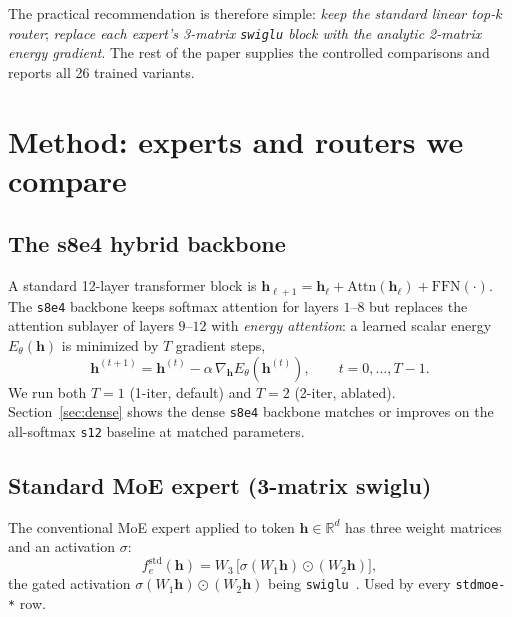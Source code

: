 \documentclass[oneside]{article}
\begin{document}
The practical recommendation is therefore simple: \emph{keep the
standard linear top-$k$ router}; \emph{replace each expert's 3-matrix
\texttt{swiglu} block with the analytic 2-matrix energy gradient}.
The rest of the paper supplies the controlled comparisons and reports
all 26 trained variants.


\section{Method: experts and routers we compare}
\label{sec:method}

\subsection{The s8e4 hybrid backbone}

A standard 12-layer transformer block is
$\mathbf{h}_{\ell+1} = \mathbf{h}_\ell + \mathrm{Attn}(\mathbf{h}_\ell) + \mathrm{FFN}(\cdot)$.
The \texttt{s8e4} backbone keeps softmax attention for layers $1$--$8$
but replaces the attention sublayer of layers $9$--$12$ with
\emph{energy attention}: a learned scalar energy
$E_\theta(\mathbf{h})$ is minimized by $T$ gradient steps,
\begin{equation}
  \mathbf{h}^{(t+1)} = \mathbf{h}^{(t)} - \alpha\, \nabla_{\mathbf{h}} E_\theta(\mathbf{h}^{(t)}),\qquad t=0,\ldots,T-1.
\end{equation}
We run both $T{=}1$ (1-iter, default) and $T{=}2$ (2-iter, ablated).
Section~\ref{sec:dense} shows the dense \texttt{s8e4} backbone matches
or improves on the all-softmax \texttt{s12} baseline at matched
parameters.

\subsection{Standard MoE expert (3-matrix swiglu)}

The conventional MoE expert applied to token $\mathbf{h}\in\mathbb{R}^d$
has three weight matrices and an activation $\sigma$:
\begin{equation}
  f^{\mathrm{std}}_e(\mathbf{h})
    = W_3\,\big[\sigma(W_1 \mathbf{h}) \odot (W_2 \mathbf{h})\big],
\end{equation}
the gated activation
$\sigma(W_1 \mathbf{h}) \odot (W_2 \mathbf{h})$ being
\texttt{swiglu}~\citep{shazeer2020glu}. Used by every
\texttt{stdmoe-*} row.
\end{document}
